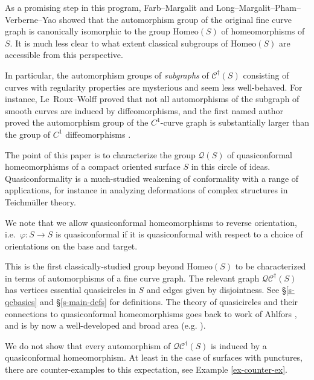 \documentclass[12pt,a4paper]{amsart}
\theoremstyle{definition}
\theoremstyle{plain}
\numberwithin{equation}{section}
\begin{document}
As a promising step in this program, Farb--Margalit \cite{farbMargalit2022Unpublished} and Long--Margalit--Pham--Verberne--Yao \cite{long2023automorphisms} showed that the automorphism group of the original fine curve graph is canonically isomorphic to the group $\text{Homeo}(S)$ of homeomorphisms of $S$.
It is much less clear to what extent classical subgroups of $\mathrm{Homeo}(S)$ are accessible from this perspective.

In particular, the automorphism groups of \textit{subgraphs} of $\mathcal{C}^{\dagger}(S)$ consisting of curves with regularity properties are mysterious and seem less well-behaved.
For instance, Le~Roux--Wolff \cite{leRouxWolff2024automorphisms} proved that not all automorphisms of the subgraph of smooth curves are induced by diffeomorphisms, and the first named author proved the automorphism group of the $C^1$-curve graph is substantially larger than the group of $C^1$ diffeomorphisms \cite{booth2024homeomorphisms}.

\vspace{0.3cm}

The point of this paper is to characterize the group $\mathcal{Q}(S)$ of quasiconformal homeomorphisms of a compact oriented surface $S$ in this circle of ideas.
Quasiconformality is a much-studied weakening of conformality with a range of applications, for instance in analyzing deformations of complex structures in Teichm\"uller theory.

We note that we allow quasiconformal homeomorphisms to reverse orientation, i.e.~$\varphi : S \to S$ is quasiconformal if it is quasiconformal with respect to a choice of orientations on the base and target.


 This is the first classically-studied group beyond $\mathrm{Homeo}(S)$ to be characterized in terms of automorphisms of a fine curve graph. The relevant graph $\mathcal{QC}^{\dagger}(S)$ has vertices essential quasicircles in $S$ and edges given by disjointness.
See \S \ref{s-qcbasics} and \S \ref{s-main-defs} for definitions.
The theory of quasicircles and their connections to quasiconformal homeomorphisms goes back to work of Ahlfors \cite{ahlfors1963quasiconformal}, and is by now a well-developed and broad area (e.g. \cite{bishop2025weilPetersson,bonsanteDancigerMaloniSchlenker2021quasicircles,gehring1999characterizations,smirnov2010dimension,tukiaVaisala1980quasisymmetric}).


We do not show that every automorphism of $\mathcal{QC}^{\dagger}(S)$ is induced by a quasiconformal homeomorphism.
At least in the case of surfaces with punctures, there are counter-examples to this expectation, see Example \ref{ex-counter-ex}.
\end{document}
